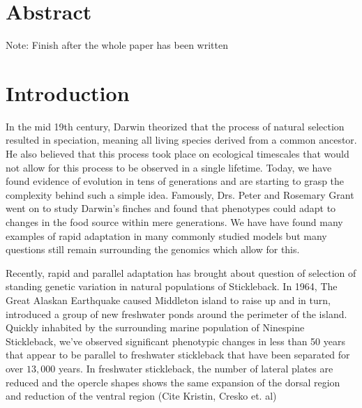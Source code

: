 \documentclass{article}
\begin{document}
\linespread{1.5}


\section{Abstract}

Note: Finish after the whole paper has been written








\section{Introduction}

In the mid 19th century,
Darwin theorized that the process of natural selection resulted in speciation, 
meaning all living species derived from a common ancestor. 
He also believed that this process took place on ecological timescales that would not allow for 
this process to be observed in a single lifetime. 
Today, we have found evidence of evolution
in tens of generations and are starting to grasp the complexity behind such a simple idea. 
Famously, Drs. Peter and Rosemary Grant went on to study Darwin's finches and
found that phenotypes could adapt to changes in the food source within mere generations.
We have have found many examples of rapid adaptation in many commonly studied models
but many questions still remain surrounding the genomics which allow for this.

Recently, rapid and parallel adaptation has brought about question of selection of
standing genetic variation in natural populations 
of Stickleback.
In 1964, The Great Alaskan Earthquake caused Middleton island to raise up and in turn, 
introduced a group of new freshwater ponds around the perimeter of the island. 
Quickly inhabited by the surrounding marine population of Ninespine Stickleback,
we've observed significant phenotypic changes in less than 50 years that appear to be 
parallel to freshwater stickleback that have been separated for over $13,000$ years. \cite{LescakE7204} 
In freshwater stickleback, 
the number of lateral plates are reduced
and the opercle shapes shows the same expansion of the dorsal region and reduction of the ventral region (Cite Kristin, Cresko et. al)
\end{document}
